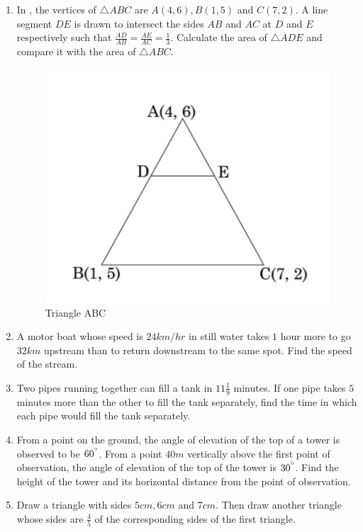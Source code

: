 \documentclass{article}
\begin{document}
\begin{enumerate}
    \item In , the vertices of $\triangle ABC$ are $A(4, 6), B(1, 5)$ and $C(7, 2)$. A line segment $DE$ is drawn to intersect the sides $AB$ and $AC$ at $D$ and $E$ respectively such that $\frac{AD}{AB} = \frac{AE}{AC} = \frac{1}{3}$. Calculate the area of $\triangle ADE$ and compare it with the area of $\triangle ABC$.
    \begin{figure}[H]
        \includegraphics[width=\columnwidth]{./triangleABC.jpg}
        \caption{Triangle ABC}
        \label{fig:triangleABC}
    \end{figure}

    \item A motor boat whose speed is $24 km/hr$ in still water takes $1$ hour more to go $32 km$ upstream than to return downstream to the same spot. Find the speed of the stream.

    \item Two pipes running together can fill a tank in $11\frac{1}{9}$ minutes. If one pipe takes $5$ minutes more than the other to fill the tank separately, find the time in which each pipe would fill the tank separately.

    \item From a point on the ground, the angle of elevation of the top of a tower is observed to be $60^{\degree}$. From a point $40 m$ vertically above the first point of observation, the angle of elevation of the top of the tower is $30^{\degree}$. Find the height of the tower and its horizontal distance from the point of observation.

    \item Draw a triangle with sides $5 cm, 6 cm$ and $7 cm$. Then draw another triangle whose sides are $\frac{4}{5}$ of the corresponding sides of the first triangle.
\end{enumerate}
\end{document}
